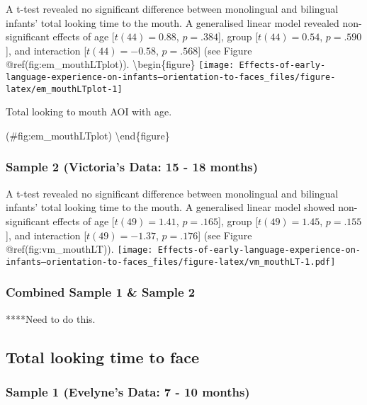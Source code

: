 \documentclass[english,man,floatsintext]{apa6}
\begin{document}
A t-test revealed no significant difference between monolingual and bilingual infants' total looking time to the mouth. A generalised linear model revealed non-significant effects of age {[}\(t(44) = 0.88\), \(p = .384\){]}, group {[}\(t(44) = 0.54\), \(p = .590\){]}, and interaction {[}\(t(44) = -0.58\), \(p = .568\){]} (see Figure @ref(fig:em\_mouthLTplot)).
\textbackslash{}begin\{figure\}
\texttt{[image: Effects-of-early-language-experience-on-infants--orientation-to-faces\_files/figure-latex/em\_mouthLTplot-1]}

\caption{Total looking to mouth AOI with age.}

(\#fig:em\_mouthLTplot)
\textbackslash{}end\{figure\}

\hypertarget{sample-2-victorias-data-15---18-months-1}{%
\subsubsection{Sample 2 (Victoria's Data: 15 - 18 months)}\label{sample-2-victorias-data-15---18-months-1}}

A t-test revealed no significant difference between monolingual and bilingual infants' total looking time to the mouth. A generalised linear model showed non-significant effects of age {[}\(t(49) = 1.41\), \(p = .165\){]}, group {[}\(t(49) = 1.45\), \(p = .155\){]}, and interaction {[}\(t(49) = -1.37\), \(p = .176\){]} (see Figure @ref(fig:vm\_mouthLT)).
\texttt{[image: Effects-of-early-language-experience-on-infants--orientation-to-faces\_files/figure-latex/vm\_mouthLT-1.pdf]}

\hypertarget{combined-sample-1-sample-2-1}{%
\subsubsection{Combined Sample 1 \& Sample 2}\label{combined-sample-1-sample-2-1}}

****Need to do this.

\hypertarget{total-looking-time-to-face}{%
\subsection{Total looking time to face}\label{total-looking-time-to-face}}

\hypertarget{sample-1-evelynes-data-7---10-months-2}{%
\subsubsection{Sample 1 (Evelyne's Data: 7 - 10 months)}\label{sample-1-evelynes-data-7---10-months-2}}
\end{document}
